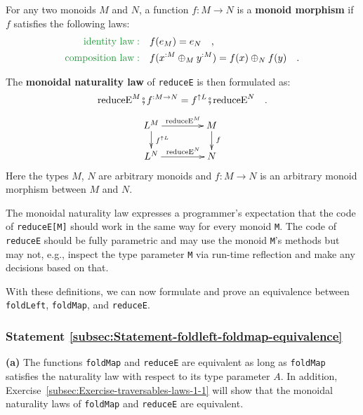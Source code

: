 For any two monoids $M$ and $N$, a function $f:M\rightarrow N$
is a \textbf{monoid morphism} if $f$
satisfies the following laws:
\begin{align*}
{\color{greenunder}\text{identity law}:}\quad & f(e_{M})=e_{N}\quad,\\
{\color{greenunder}\text{composition law}:}\quad & f(x^{:M}\oplus_{M}y^{:M})=f(x)\oplus_{N}f(y)\quad.
\end{align*}

The \textbf{monoidal naturality law} of
\lstinline!reduceE! is then formulated as:
\begin{equation}
\text{reduceE}^{M}\bef f^{:M\rightarrow N}=f^{\uparrow L}\bef\text{reduceE}^{N}\quad.\label{eq:monoidal-naturality-law-of-reduceE}
\end{equation}
\[
\xymatrix{\xyScaleY{1.4pc}\xyScaleX{3.5pc}L^{M}\ar[r]\sp(0.5){\ \text{reduceE}^{M}}\ar[d]\sp(0.45){\,f^{\uparrow L}} & M\ar[d]\sp(0.45){\,f}\\
L^{N}\ar[r]\sp(0.5){~\text{reduceE}^{N}} & N
}
\]
Here the types $M$, $N$ are arbitrary monoids and $f:M\rightarrow N$
is an arbitrary monoid morphism between $M$ and $N$. 

The monoidal naturality law expresses a programmer\textsf{'}s expectation that
the code of \lstinline!reduceE[M]! should work in the same way for
every monoid \lstinline!M!. The code of \lstinline!reduceE! should
be fully parametric and may use the monoid \lstinline!M!\textsf{'}s methods
but may not, e.g., inspect the type parameter \lstinline!M! via run-time
reflection and make any decisions based on that. 

With these definitions, we can now formulate and prove an equivalence
between \lstinline!foldLeft!, \lstinline!foldMap!, and \lstinline!reduceE!.

\subsubsection{Statement \label{subsec:Statement-foldleft-foldmap-equivalence}\ref{subsec:Statement-foldleft-foldmap-equivalence}}

\textbf{(a)} The functions \lstinline!foldMap! and \lstinline!reduceE!
are equivalent as long as \lstinline!foldMap! satisfies the naturality
law with respect to its type parameter $A$. In addition, Exercise~\ref{subsec:Exercise-traversables-laws-1-1}
will show that the monoidal naturality laws of \lstinline!foldMap!
and \lstinline!reduceE! are equivalent.

